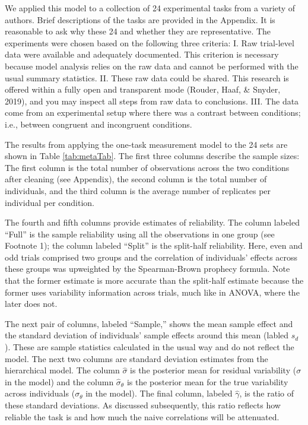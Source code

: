 \documentclass[
  ,man]{apa6}
\begin{document}
We applied this model to a collection of 24 experimental tasks from a variety of authors. Brief descriptions of the tasks are provided in the Appendix. It is reasonable to ask why these 24 and whether they are representative.
The experiments were chosen based on the following three criteria: I. Raw trial-level data were available and adequately documented. This criterion is necessary because model analysis relies on the raw data and cannot be performed with the usual summary statistics. II. These raw data could be shared. This research is offered within a fully open and transparent mode (Rouder, Haaf, \& Snyder, 2019), and you may inspect all steps from raw data to conclusions. III. The data come from an experimental setup where there was a contrast between conditions; i.e., between congruent and incongruent conditions.

The results from applying the one-task measurement model to the 24 sets are shown in Table \ref{tab:metaTab}. The first three columns describe the sample sizes: The first column is the total number of observations across the two conditions after cleaning (see Appendix), the second column is the total number of individuals, and the third column is the average number of replicates per individual per condition.

The fourth and fifth columns provide estimates of reliability. The column labeled ``Full'' is the sample reliability using all the observations in one group (see Footnote 1); the column labeled ``Split'' is the split-half reliability. Here, even and odd trials comprised two groups and the correlation of individuals' effects across these groups was upweighted by the Spearman-Brown prophecy formula. Note that the former estimate is more accurate than the split-half estimate because the former uses variability information across trials, much like in ANOVA, where the later does not.

The next pair of columns, labeled ``Sample,'' shows the mean sample effect and the standard deviation of individuals' sample effects around this mean (labled \(s_d\)). These are sample statistics calculated in the usual way and do not reflect the model. The next two columns are standard deviation estimates from the hierarchical model. The column \(\hat{\sigma}\) is the posterior mean for residual variability (\(\sigma\) in the model) and the column \(\hat{\sigma}_\theta\) is the posterior mean for the true variability across individuals (\(\sigma_\theta\) in the model). The final column, labeled \(\hat{\gamma}\), is the ratio of these standard deviations. As discussed subsequently, this ratio reflects how reliable the task is and how much the naive correlations will be attenuated.
\end{document}
